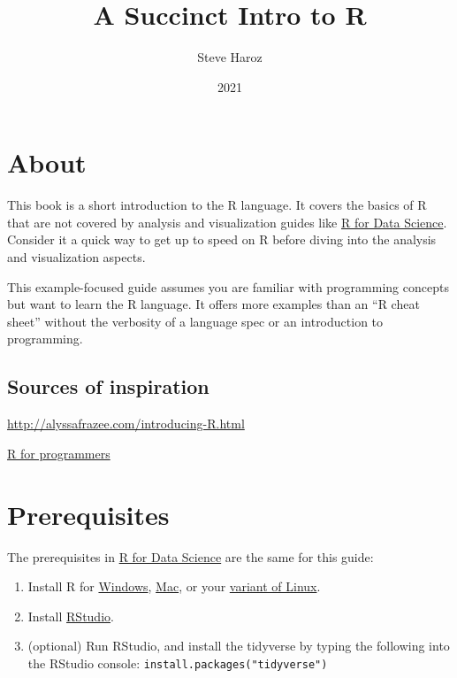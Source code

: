 \documentclass[
]{book}
\title{A Succinct Intro to R}
\author{Steve Haroz}
\date{2021}
\providecommand{\tightlist}{%
  \setlength{\itemsep}{0pt}\setlength{\parskip}{0pt}}
\begin{document}
\maketitle

{
\setcounter{tocdepth}{1}
\tableofcontents
}
\hypertarget{about}{%
\chapter*{About}\label{about}}

This book is a short introduction to the R language. It covers the basics of R that are not covered by analysis and visualization guides like \href{https://r4ds.had.co.na}{R for Data Science}. Consider it a quick way to get up to speed on R before diving into the analysis and visualization aspects.

This example-focused guide assumes you are familiar with programming concepts but want to learn the R language. It offers more examples than an ``R cheat sheet'' without the verbosity of a language spec or an introduction to programming.

\hypertarget{sources-of-inspiration}{%
\section*{Sources of inspiration}\label{sources-of-inspiration}}

\url{http://alyssafrazee.com/introducing-R.html}

\href{http://www.johndcook.com/R_language_for_programmers.html}{R for programmers}

\hypertarget{prerequisites}{%
\chapter*{Prerequisites}\label{prerequisites}}

The prerequisites in \href{https://r4ds.had.co.nz/introduction.html\#prerequisites}{R for Data Science} are the same for this guide:

\begin{enumerate}
\def\labelenumi{\arabic{enumi}.}
\tightlist
\item
  Install R for \href{https://cloud.r-project.org/bin/windows/base/}{Windows}, \href{https://cloud.r-project.org/bin/macosx/}{Mac}, or your \href{https://cloud.r-project.org/bin/linux/}{variant of Linux}.
\item
  Install \href{https://www.rstudio.com/products/rstudio/}{RStudio}.
\item
  (optional) Run RStudio, and install the tidyverse by typing the following into the RStudio console: \texttt{install.packages("tidyverse")}
\end{enumerate}
\end{document}
